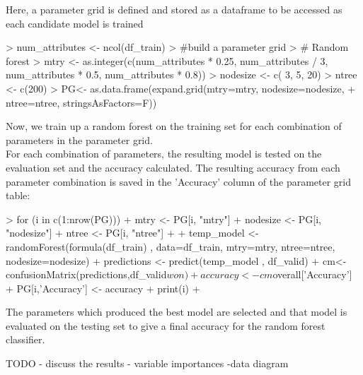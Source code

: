 \documentclass[10pt]{article}
\begin{document}
Here, a parameter grid is defined and stored as a dataframe to be accessed as each candidate model is trained
\begin{Schunk}
\begin{Sinput}
> num_attributes <- ncol(df_train)
> #build a parameter grid
> # Random forest
> mtry <- as.integer(c(num_attributes * 0.25, num_attributes / 3, num_attributes * 0.5, num_attributes * 0.8))
> nodesize <- c( 3, 5, 20)
> ntree <- c(200)
> PG<- as.data.frame(expand.grid(mtry=mtry, nodesize=nodesize,
+                                          ntree=ntree, stringsAsFactors=F))
\end{Sinput}
\end{Schunk}
Now, we train up a random forest on the training set for each combination of parameters in the parameter grid. \\
For each combination of parameters, the resulting model is tested on the evaluation set and the accuracy calculated.
The resulting accuracy from each parameter combination is saved in the 'Accuracy' column of the parameter grid table:
\begin{Schunk}
\begin{Sinput}
> for (i in c(1:nrow(PG))){
+   mtry <- PG[i, "mtry"]
+   nodesize <- PG[i, "nodesize"]
+   ntree <- PG[i, "ntree"]
+ 
+   temp_model <- randomForest(formula(df_train) , data=df_train, mtry=mtry, ntree=ntree, nodesize=nodesize)
+   predictions <- predict(temp_model , df_valid)
+   cm<- confusionMatrix(predictions,df_valid$won)
+   accuracy <- cm$overall['Accuracy']
+   PG[i,'Accuracy'] <- accuracy
+   print(i)
+ }
\end{Sinput}
\end{Schunk}

The parameters which produced the best model are selected and that model is evaluated on the testing set to give a final accuracy for the random forest classifier.
\begin{Schunk}
\end{Schunk}
TODO - discuss the results
    - variable importances
    -data diagram
  
\end{document}
